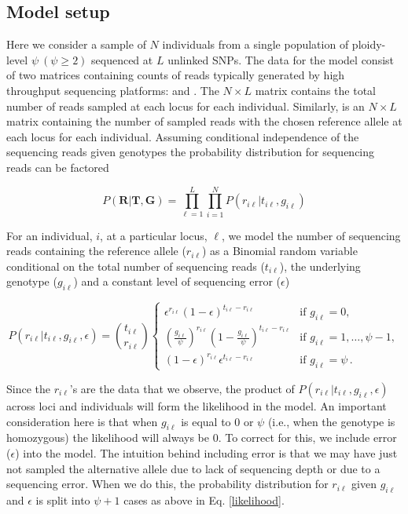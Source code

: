 \documentclass[11pt,english,letterpaper,oneside]{article}
\begin{document}
\medskip
\subsection*{Model setup}
\medskip

Here we consider a sample of $N$ individuals from a single population of ploidy-level $\psi\: (\psi\geq2)$ sequenced at $L$ unlinked SNPs. The data for the model consist of two matrices containing counts of reads typically generated by high throughput sequencing platforms: \tmat{} and \rmat. The $N\times L$ matrix \tmat{} contains the total number of reads sampled at each locus for each individual. Similarly, \rmat{} is an $N\times L$ matrix containing the number of sampled reads with the chosen reference allele at each locus for each individual. Assuming conditional independence of the sequencing reads given genotypes the probability distribution for sequencing reads can be factored

\begin{equation}\label{factored_lik}
P(\bm{R}|\bm{T},\bm{G}) = \displaystyle\prod_{\ell=1}^L\displaystyle\prod_{i=1}^N P(r_{i \ell}|t_{i \ell},g_{i \ell})
\end{equation}

\noindent For an individual, $i$, at a particular locus, $\ell$, we model the number of sequencing reads containing the reference allele ($r_{i\ell}$) as a Binomial random variable conditional on the total number of sequencing reads ($t_{i\ell} $), the underlying genotype ($g_{i\ell}$) and a constant level of sequencing error ($\epsilon$)

\begin{equation}\label{likelihood}
{P}(r_{i \ell}|t_{i\ell}, g_{i \ell},\epsilon) = \binom{t_{i \ell}}{r_{i \ell}}
	\begin{cases}
	\epsilon^{r_{i \ell}}(1-\epsilon)^{t_{i \ell}-r_{i \ell}} & \text{if  } g_{i \ell} = 0, \\[0.05in]
	\left(\frac{g_{i \ell}}{\psi}\right)^{r_{i \ell}}\left(1-\frac{g_{i \ell}}{\psi}\right)^{t_{i \ell}-r_{i \ell}} & \text{if  } g_{i \ell} = 1,\ldots,\psi-1, \\[0.05in]
	(1-\epsilon)^{r_{i \ell}}\epsilon^{t_{i \ell}-r_{i \ell}} & \text{if  } g_{i \ell} = \psi\,.
	\end{cases}
\end{equation}


\noindent Since the $r_{i \ell}$'s are the data that we observe, the product of $P(r_{i \ell}|t_{i\ell}, g_{i \ell},\epsilon)$ across loci and individuals will form the likelihood in the model. An important consideration here is that when $g_{i \ell}$ is equal to 0 or $\psi$ (i.e., when the genotype is homozygous) the likelihood will always be 0. To correct for this, we include error ($\epsilon$) into the model. The intuition behind including error is that we may have just not sampled the alternative allele due to lack of sequencing depth or due to a sequencing error. When we do this, the probability distribution for $r_{i\ell}$ given $g_{i\ell}$ and $\epsilon$ is split into $\psi+1$ cases as above in Eq. \ref{likelihood}.
\end{document}
